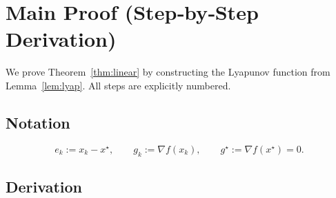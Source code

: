 \documentclass{article}
\begin{document}
\newpage

\section*{Main Proof (Step‑by‑Step Derivation)}
We prove Theorem~\ref{thm:linear} by constructing the Lyapunov function from Lemma~\ref{lem:lyap}. All steps are explicitly numbered.

\subsection*{Notation}
\[
e_k:=x_k-x^\star,\qquad g_k:=\nabla f(x_k),\qquad 
g^\star:=\nabla f(x^\star)=0 .
\]

\subsection*{Derivation}
\end{document}
